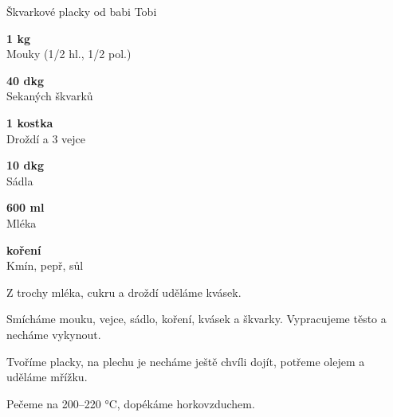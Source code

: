 \documentclass[11pt,a4paper]{article}
\begin{document}
\begin{recipe}[RawSienna]{Škvarkové placky od babi Tobi}
    \begin{ingredients}
        \item \parbox[t]{\linewidth}{\raggedright \weight \textbf{1 kg}\\ Mouky (1/2 hl., 1/2 pol.)}
        \item \parbox[t]{\linewidth}{\raggedright \weight \textbf{40 dkg}\\ Sekaných škvarků}
        \item \parbox[t]{\linewidth}{\raggedright \piece \textbf{1 kostka}\\ Droždí a 3 vejce}
        \item \parbox[t]{\linewidth}{\raggedright \weight \textbf{10 dkg}\\ Sádla}
        \item \parbox[t]{\linewidth}{\raggedright \liquid \textbf{600 ml}\\ Mléka}
        \item \parbox[t]{\linewidth}{\raggedright \indefinite \textbf{koření}\\ Kmín, pepř, sůl}
    \end{ingredients}
    \begin{steps}
        \item Z trochy mléka, cukru a droždí uděláme kvásek.
        \item Smícháme mouku, vejce, sádlo, koření, kvásek a škvarky. Vypracujeme těsto a necháme vykynout.
        \item Tvoříme placky, na plechu je necháme ještě chvíli dojít, potřeme olejem a uděláme mřížku.
        \item Pečeme na 200--220 °C, dopékáme horkovzduchem.
    \end{steps}
\end{recipe}
\end{document}
